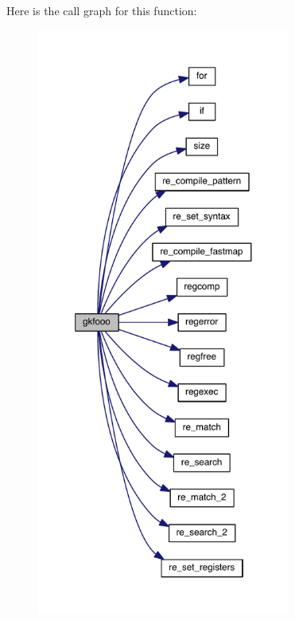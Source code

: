 Here is the call graph for this function\+:\nopagebreak
\begin{figure}[H]
\begin{center}
\leavevmode
\includegraphics[height=550pt]{a00089_a9f14e34dd94536974509bad2ab7f8c95_cgraph}
\end{center}
\end{figure}
